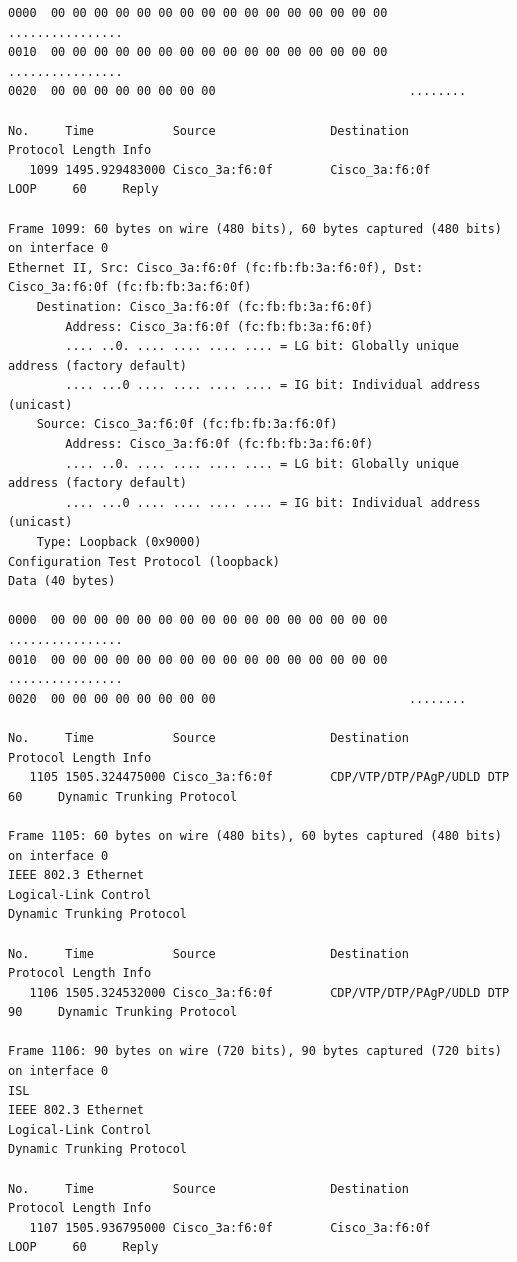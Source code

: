 \documentclass[a4paper,11pt]{article}
\begin{document}
\begin{lstlisting}
0000  00 00 00 00 00 00 00 00 00 00 00 00 00 00 00 00   ................
0010  00 00 00 00 00 00 00 00 00 00 00 00 00 00 00 00   ................
0020  00 00 00 00 00 00 00 00                           ........

No.     Time           Source                Destination           Protocol Length Info
   1099 1495.929483000 Cisco_3a:f6:0f        Cisco_3a:f6:0f        LOOP     60     Reply

Frame 1099: 60 bytes on wire (480 bits), 60 bytes captured (480 bits) on interface 0
Ethernet II, Src: Cisco_3a:f6:0f (fc:fb:fb:3a:f6:0f), Dst: Cisco_3a:f6:0f (fc:fb:fb:3a:f6:0f)
    Destination: Cisco_3a:f6:0f (fc:fb:fb:3a:f6:0f)
        Address: Cisco_3a:f6:0f (fc:fb:fb:3a:f6:0f)
        .... ..0. .... .... .... .... = LG bit: Globally unique address (factory default)
        .... ...0 .... .... .... .... = IG bit: Individual address (unicast)
    Source: Cisco_3a:f6:0f (fc:fb:fb:3a:f6:0f)
        Address: Cisco_3a:f6:0f (fc:fb:fb:3a:f6:0f)
        .... ..0. .... .... .... .... = LG bit: Globally unique address (factory default)
        .... ...0 .... .... .... .... = IG bit: Individual address (unicast)
    Type: Loopback (0x9000)
Configuration Test Protocol (loopback)
Data (40 bytes)

0000  00 00 00 00 00 00 00 00 00 00 00 00 00 00 00 00   ................
0010  00 00 00 00 00 00 00 00 00 00 00 00 00 00 00 00   ................
0020  00 00 00 00 00 00 00 00                           ........

No.     Time           Source                Destination           Protocol Length Info
   1105 1505.324475000 Cisco_3a:f6:0f        CDP/VTP/DTP/PAgP/UDLD DTP      60     Dynamic Trunking Protocol

Frame 1105: 60 bytes on wire (480 bits), 60 bytes captured (480 bits) on interface 0
IEEE 802.3 Ethernet 
Logical-Link Control
Dynamic Trunking Protocol

No.     Time           Source                Destination           Protocol Length Info
   1106 1505.324532000 Cisco_3a:f6:0f        CDP/VTP/DTP/PAgP/UDLD DTP      90     Dynamic Trunking Protocol

Frame 1106: 90 bytes on wire (720 bits), 90 bytes captured (720 bits) on interface 0
ISL
IEEE 802.3 Ethernet 
Logical-Link Control
Dynamic Trunking Protocol

No.     Time           Source                Destination           Protocol Length Info
   1107 1505.936795000 Cisco_3a:f6:0f        Cisco_3a:f6:0f        LOOP     60     Reply


\end{lstlisting}
\end{document}

